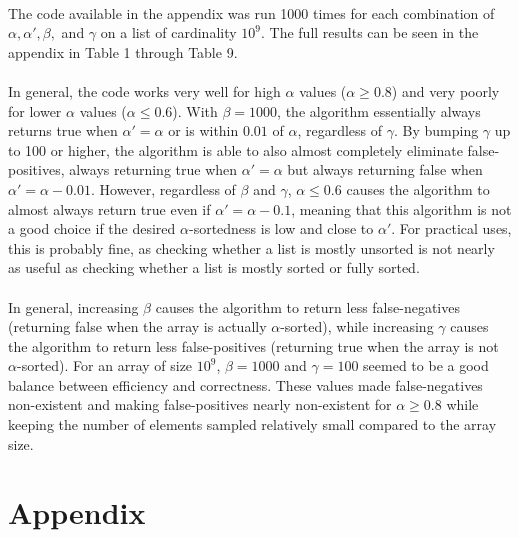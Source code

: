 \documentclass{article}
\begin{document}
\paragraph{}The code available in the appendix was run 1000 times for each combination of $\alpha, \alpha', \beta,$ and $\gamma$ on a list of cardinality $10^9$.
 The full results can be seen in the appendix in Table 1 through Table 9.
\paragraph{}In general, the code works very well for high $\alpha$ values ($\alpha \geq 0.8$) and very poorly for lower $\alpha$ values ($\alpha \leq 0.
6$).
 With $\beta = 1000$, the algorithm essentially always returns true when $\alpha' = \alpha$ or is within $0.01$ of $\alpha$, regardless of $\gamma$.
By bumping $\gamma$ up to 100 or higher, the algorithm is able to also almost completely eliminate false-positives, always returning true when $\alpha'=\alpha$ but always returning false when $\alpha'=\alpha-0.01$.
However, regardless of $\beta$ and $\gamma$, $\alpha \leq 0.6$ causes the algorithm to almost always return true even if $\alpha' = \alpha - 0.1$, meaning that this algorithm is not a good choice if the desired $\alpha$-sortedness is low and close to $\alpha'$.
For practical uses, this is probably fine, as checking whether a list is mostly unsorted is not nearly as useful as checking whether a list is mostly sorted or fully sorted.
\paragraph{}In general, increasing $\beta$ causes the algorithm to return less false-negatives (returning false when the array is actually $\alpha$-sorted), while increasing $\gamma$ causes the algorithm to return less false-positives (returning true when the array is not $\alpha$-sorted).
 For an array of size $10^9$, $\beta=1000$ and $\gamma=100$ seemed to be a good balance between efficiency and correctness.
These values made false-negatives non-existent and making false-positives nearly non-existent for $\alpha \geq 0.8$ while keeping the number of elements sampled relatively small compared to the array size.
\section{Appendix}
\end{document}
